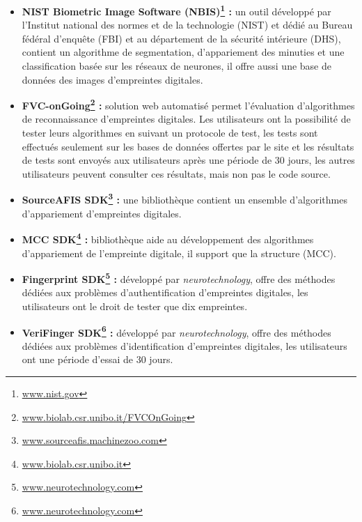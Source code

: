 \begin{itemize}

	\item  \textbf{NIST Biometric Image Software (NBIS)\footnote{\href{https://www.nist.gov/services-resources/software/nist-biometric-image-software-nbis}{www.nist.gov}} :} un outil développé par l'Institut national des normes et de la technologie (NIST) et dédié au Bureau fédéral d'enquête (FBI) et au département de la sécurité intérieure (DHS), contient un algorithme de segmentation, d’appariement des minuties et une classification basée sur les réseaux de neurones, il offre aussi une base de données des images d’empreintes digitales. 

	\item \textbf{FVC-onGoing\footnote{\href{https://biolab.csr.unibo.it/FVCOnGoing/UI/Form/Home.aspx}{www.biolab.csr.unibo.it/FVCOnGoing}} : }solution web automatisé permet l'évaluation d'algorithmes de reconnaissance d'empreintes digitales. Les utilisateurs ont la possibilité de tester leurs algorithmes en suivant un protocole de test, les tests sont effectués seulement sur les bases de données offertes par le site et les résultats de tests sont envoyés aux utilisateurs après une période de 30 jours, les autres utilisateurs peuvent consulter ces résultats, mais non pas le code source.

	\item \textbf{SourceAFIS SDK\footnote{\href{https://sourceafis.machinezoo.com/}{www.sourceafis.machinezoo.com}} :} une bibliothèque contient un ensemble d'algorithmes d'appariement d'empreintes digitales.

	\item \textbf{MCC SDK\footnote{\href{http://biolab.csr.unibo.it/research.asp}{www.biolab.csr.unibo.it}} :} bibliothèque aide au développement des algorithmes d'appariement de l'empreinte digitale, il support que la structure (MCC).

	\item \textbf{Fingerprint SDK\footnote{\href{http://www.neurotechnology.com/free-fingerprint-verification-sdk.html}{www.neurotechnology.com}} :} développé par \textit{neurotechnology}, offre des méthodes dédiées aux problèmes d’authentification d’empreintes digitales, les utilisateurs ont le droit de tester que dix empreintes.

	\item \textbf{VeriFinger SDK\footnote{\href{http://www.neurotechnology.com/free-fingerprint-verification-sdk.html}{www.neurotechnology.com}} :} développé par \textit{neurotechnology}, offre des méthodes dédiées aux problèmes d'identification d’empreintes digitales, les utilisateurs ont une période d’essai de 30 jours.


\end{itemize}
